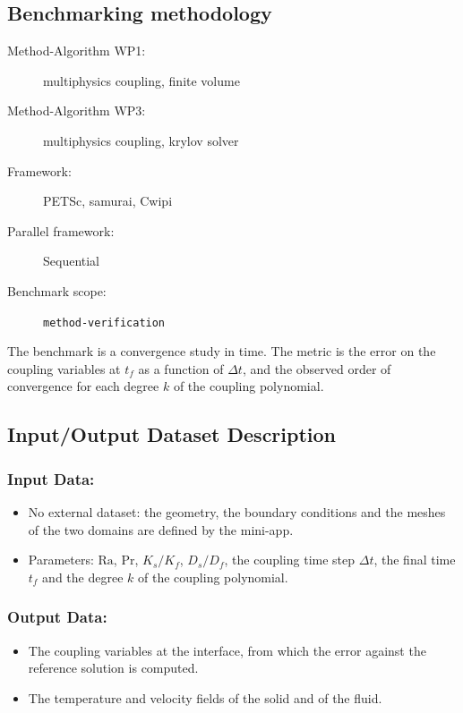 \subsection{Benchmarking methodology}
\begin{description}
  \item[Method-Algorithm WP1:] multiphysics coupling, finite volume
  \item[Method-Algorithm WP3:] multiphysics coupling, krylov solver
  \item[Framework:] PETSc, samurai, Cwipi
  \item[Parallel framework:] Sequential
  \item[Benchmark scope:] \texttt{method-verification}
\end{description}

The benchmark is a convergence study in time. The metric is the error on the
coupling variables at $t_f$ as a function of $\Delta t$, and the observed order
of convergence for each degree $k$ of the coupling polynomial.



\subsection{Input/Output Dataset Description}

\subsubsection{Input Data:}
  \begin{itemize}
  \item No external dataset: the geometry, the boundary conditions and the
    meshes of the two domains are defined by the mini-app.
  \item Parameters: $\mathrm{Ra}$, $\mathrm{Pr}$, $K_s/K_f$, $D_s/D_f$, the
    coupling time step $\Delta t$, the final time $t_f$ and the degree $k$ of
    the coupling polynomial.
  \end{itemize}

\subsubsection{Output Data:}
  \begin{itemize}
  \item The coupling variables at the interface, from which the error against
    the reference solution is computed.
  \item The temperature and velocity fields of the solid and of the fluid.
  \end{itemize}


